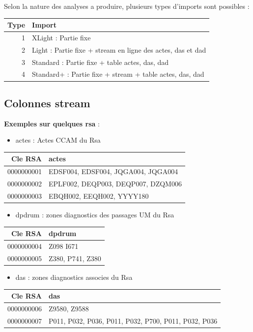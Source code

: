 \documentclass[]{book}
\providecommand{\tightlist}{%
  \setlength{\itemsep}{0pt}\setlength{\parskip}{0pt}}
\begin{document}
Selon la nature des analyses a produire, plusieurs types d'imports sont
possibles :

\begin{longtable}[]{@{}rl@{}}
\toprule
Type & Import\tabularnewline
\midrule
\endhead
1 & XLight : Partie fixe\tabularnewline
2 & Light : Partie fixe + stream en ligne des actes, das et
dad\tabularnewline
3 & Standard : Partie fixe + table actes, das, dad\tabularnewline
4 & Standard+ : Partie fixe + stream + table actes, das,
dad\tabularnewline
\bottomrule
\end{longtable}

\subsection{Colonnes stream}\label{colonnes-stream}

\textbf{Exemples sur quelques rsa} :

\begin{itemize}
\tightlist
\item
  actes : Actes CCAM du Rsa
\end{itemize}

\begin{longtable}[]{@{}rl@{}}
\toprule
Cle RSA & actes\tabularnewline
\midrule
\endhead
0000000001 & EDSF004, EDSF004, JQGA004, JQGA004\tabularnewline
0000000002 & EPLF002, DEQP003, DEQP007, DZQM006\tabularnewline
0000000003 & EBQH002, EEQH002, YYYY180\tabularnewline
\bottomrule
\end{longtable}

\begin{itemize}
\tightlist
\item
  dpdrum : zones diagnostics des passages UM du Rsa
\end{itemize}

\begin{longtable}[]{@{}rl@{}}
\toprule
Cle RSA & dpdrum\tabularnewline
\midrule
\endhead
0000000004 & Z098 I671\tabularnewline
0000000005 & Z380, P741, Z380\tabularnewline
\bottomrule
\end{longtable}

\begin{itemize}
\tightlist
\item
  das : zones diagnostics associes du Rsa
\end{itemize}

\begin{longtable}[]{@{}rl@{}}
\toprule
Cle RSA & das\tabularnewline
\midrule
\endhead
0000000006 & Z9580, Z9588\tabularnewline
0000000007 & P011, P032, P036, P011, P032, P700, P011, P032,
P036\tabularnewline
\bottomrule
\end{longtable}
\end{document}
